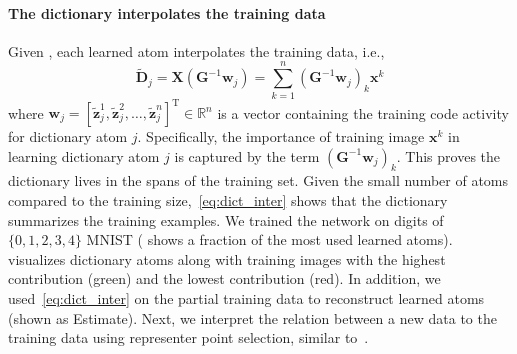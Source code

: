 \documentclass[10pt]{article} %
\newcommand{\R}{\mathbb{R}} %
\newcommand{\D}{{\bm D}}
\newcommand{\Xx}{{\bm X}}
\newcommand{\G}{{\bm G}}
\newcommand{\x}{{\bm x}}
\newcommand{\w}{{\bm w}}
\newcommand{\z}{{\bm z}}
\begin{document}
\paragraph{The dictionary interpolates the training data} Given , each learned atom interpolates the training data, i.e.,
%
%
\vspace{-2mm}
\begin{equation}\label{eq:dict_inter}
	\tilde \D_j =  \Xx (\G^{-1}\w_j) = \sum_{k=1}^n (\G^{-1}\w_j)_k \x^k
\end{equation}
where $\w_j = [\tilde \z^{1}_j, \tilde \z^{2}_j, \ldots, \tilde \z^{n}_j]^{\text{T}} \in \R^n$ is a vector containing the training code activity for dictionary atom $j$. Specifically, the importance of training image $\x^k$ in learning dictionary atom $j$ is captured by the term $(\G^{-1}\w_j)_k$. This proves the dictionary lives in the spans of the training set. Given the small number of atoms compared to the training size,~\eqref{eq:dict_inter} shows that the dictionary summarizes the training examples. We trained the network on digits of $\{0, 1, 2, 3, 4\}$ MNIST ( shows a fraction of the most used learned atoms).  visualizes dictionary atoms along with training images with the highest contribution (green) and the lowest contribution (red). In addition, we used~\eqref{eq:dict_inter} on the partial training data to reconstruct learned atoms (shown as Estimate). Next, we interpret the relation between a new data to the training data using representer point selection, similar to~\citep{yeh2018representer}.
\end{document}

